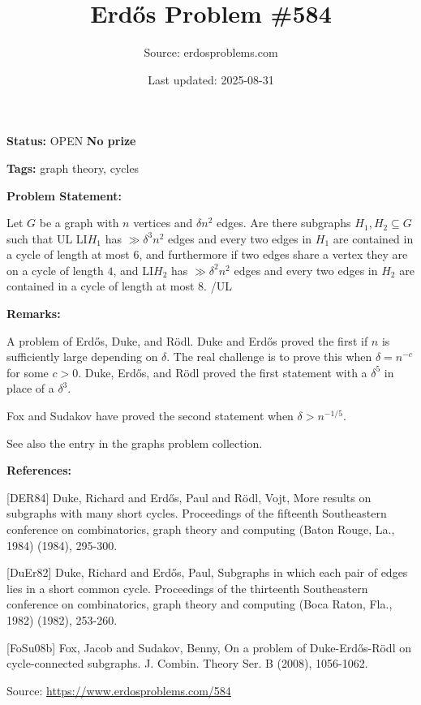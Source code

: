 \documentclass{article}
\title{Erd\H{o}s Problem \#584}
\date{Last updated: 2025-08-31}
\author{Source: erdosproblems.com}
\begin{document}
\maketitle

\noindent\textbf{Status:} OPEN \quad \textbf{No prize}

\noindent\textbf{Tags:} graph theory, cycles

\medskip
\noindent\textbf{Problem Statement:}

Let $G$ be a graph with $n$ vertices and $\delta n^{2}$ edges. Are there subgraphs $H_1,H_2\subseteq G$ such that
{UL}
{LI}$H_1$ has $\gg \delta^3n^2$ edges and every two edges in $H_1$ are contained in a cycle of length at most $6$, and furthermore if two edges share a vertex they are on a cycle of length $4$, and
{LI}$H_2$ has $\gg \delta^2n^2$ edges and every two edges in $H_2$ are contained in a cycle of length at most $8$.
{/UL}

\bigskip
\noindent\textbf{Remarks:}

A problem of Erd\H{o}s, Duke, and R\"{o}dl. Duke and Erd\H{o}s \cite{DuEr82} proved the first if $n$ is sufficiently large depending on $\delta$. The real challenge is to prove this when $\delta=n^{-c}$ for some $c>0$. Duke, Erd\H{o}s, and R\"{o}dl \cite{DER84} proved the first statement with a $\delta^5$ in place of a $\delta^3$.

Fox and Sudakov \cite{FoSu08b} have proved the second statement when $\delta >n^{-1/5}$. 

See also the entry in the graphs problem collection.

\bigskip
\noindent\textbf{References:}

[DER84] Duke, Richard and Erd\H{o}s, Paul and R\"{o}dl, Vojt\vEch, More results on subgraphs with many short cycles. Proceedings of the fifteenth Southeastern conference on
combinatorics, graph theory and computing (Baton Rouge,
La., 1984) (1984), 295-300.
 
 [DuEr82] Duke, Richard and Erd\H{o}s, Paul, Subgraphs in which each pair of edges lies in a short common
cycle. Proceedings of the thirteenth Southeastern conference on
combinatorics, graph theory and computing (Boca Raton,
Fla., 1982) (1982), 253-260.
 
 [FoSu08b] Fox, Jacob and Sudakov, Benny, On a problem of Duke-Erd\H{o}s-R\"{o}dl on cycle-connected subgraphs. J. Combin. Theory Ser. B (2008), 1056-1062.

\bigskip
\noindent\small{Source: \url{https://www.erdosproblems.com/584}}
\end{document}

